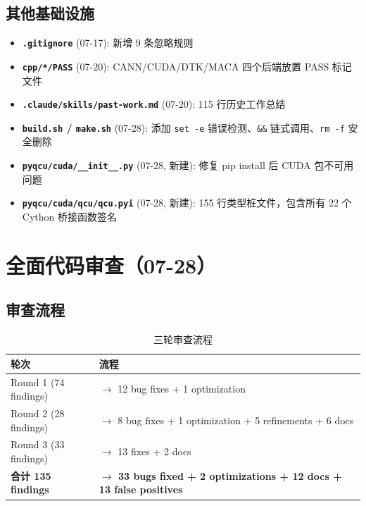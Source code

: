 \documentclass[11pt,a4paper]{article}
\begin{document}
\subsection{其他基础设施}

\begin{itemize}
    \item \textbf{\texttt{.gitignore}} (07-17): 新增 9 条忽略规则
    \item \textbf{\texttt{cpp/*/PASS}} (07-20): CANN/CUDA/DTK/MACA 四个后端放置 PASS 标记文件
    \item \textbf{\texttt{.claude/skills/past-work.md}} (07-20): 115 行历史工作总结
    \item \textbf{\texttt{build.sh} / \texttt{make.sh}} (07-28): 添加 \texttt{set -e} 错误检测、\texttt{\&\&} 链式调用、\texttt{rm -f} 安全删除
    \item \textbf{\texttt{pyqcu/cuda/\_\_init\_\_.py}} (07-28, 新建): 修复 pip install 后 CUDA 包不可用问题
    \item \textbf{\texttt{pyqcu/cuda/qcu/qcu.pyi}} (07-28, 新建): 155 行类型桩文件，包含所有 22 个 Cython 桥接函数签名
\end{itemize}

\section{全面代码审查（07-28）}

\subsection{审查流程}

\begin{table}[ht]
\centering
\caption{三轮审查流程}
\begin{tabular}{ll}
\toprule
轮次 & 流程 \\
\midrule
Round 1 (74 findings) & $\rightarrow$ 12 bug fixes + 1 optimization \\
Round 2 (28 findings) & $\rightarrow$ 8 bug fixes + 1 optimization + 5 refinements + 6 docs \\
Round 3 (33 findings) & $\rightarrow$ 13 fixes + 2 docs \\
\midrule
\textbf{合计 135 findings} & \textbf{$\rightarrow$ 33 bugs fixed + 2 optimizations + 12 docs + 13 false positives} \\
\bottomrule
\end{tabular}
\end{table}
\end{document}
